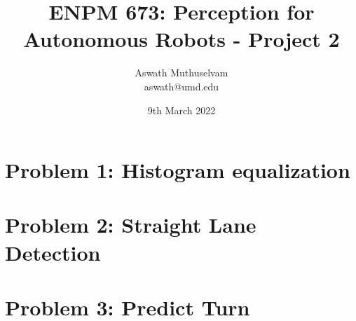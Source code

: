 \documentclass[a4paper, 10pt]{article}
\title{ENPM 673: Perception for Autonomous Robots - Project 2}
\author{Aswath Muthuselvam \\ aswath@umd.edu}
\date{9th March 2022}
\begin{document}
\maketitle
{}
	
\begin{multicols}{2}
		
\section{Problem 1: Histogram equalization}


\section{Problem 2: Straight Lane Detection}


\section{Problem 3: Predict Turn}	
	
		
\end{multicols}
	
\end{document}
